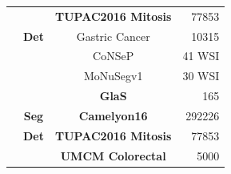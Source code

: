 \documentclass[conference]{IEEEtran}
\begin{document}
\begin{table}[]
{\begin{tabular}{|c|c|cr|}
    \multirow{-22}{*}{\cite{mormont2020multi}}   &                                  & { \textbf{TUPAC2016 Mitosis \cite{veta2019predicting}}}                                                                                    & 77853                                                   \\ \cline{1-1}
    \cite{yu2021large}                           & \multirow{-7}{*}{\textbf{Det}}   & Gastric Cancer \cite{yu2021large}                                                                                                                              & 10315                                                   \\ \hline
                                                                  &                                  & CoNSeP \cite{graham2019hover}                                                                                                                                  & 41 WSI                                                  \\
    \multirow{-2}{*}{\cite{wang2021bend}}        &                                  & MoNuSegv1 \cite{kumar2017dataset}                                                                                                                              & 30 WSI                                                  \\ \cline{1-1}
    \cite{rezazadeh2023multi}                    &                                  & { \textbf{GlaS \cite{sirinukunwattana2017gland}}}                                                                                          & 165                                                     \\ \cline{1-1} \cline{3-4} 
                                                                  & \multirow{-4}{*}{\textbf{Seg}}   & { \textbf{Camelyon16 \cite{bejnordi2017diagnostic}}}                                                                                       & 292226                                                  \\ \cline{2-2}
    \multirow{-2}{*}{\cite{tellez2020extending}} & \textbf{Det}                     & { \textbf{TUPAC2016 Mitosis \cite{veta2019predicting}}}                                                                                    & 77853                                                   \\ \hline
    \cite{marik2022supervision}                  &                                  & { \textbf{UMCM Colorectal \cite{kather2016multi}}}                                                                                         & 5000                                                    \\ \cline{1-1} \cline{3-4} 

\end{tabular}}
\end{table}
\end{document}
